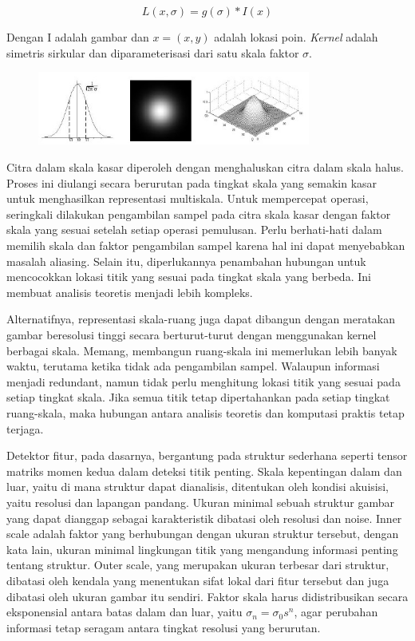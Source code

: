 \begin{equation}
L(x,\sigma) = g(\sigma) * I(x)
\label{eq:konvolusi}
\end{equation}

Dengan I adalah gambar dan \(x = (x,y)\) adalah lokasi poin.
\emph{Kernel} adalah simetris sirkular dan diparameterisasi dari satu skala faktor \(\sigma \).

\begin{figure}
  \centering{}
  \includegraphics[width=0.8\textwidth]{gambar/Uniform Gaussian kernel.jpg}
  \caption{}
\end{figure}

Citra dalam skala kasar diperoleh dengan menghaluskan citra dalam skala halus. 
Proses ini diulangi secara berurutan pada tingkat skala yang semakin kasar untuk menghasilkan representasi multiskala. 
Untuk mempercepat operasi, seringkali dilakukan pengambilan sampel pada citra skala kasar dengan faktor skala yang sesuai setelah setiap operasi pemulusan. 
Perlu berhati-hati dalam memilih skala dan faktor pengambilan sampel karena hal ini dapat menyebabkan masalah aliasing. 
Selain itu, diperlukannya penambahan hubungan untuk mencocokkan lokasi titik yang sesuai pada tingkat skala yang berbeda. 
Ini membuat analisis teoretis menjadi lebih kompleks.

Alternatifnya, representasi skala-ruang juga dapat dibangun dengan meratakan gambar beresolusi tinggi secara berturut-turut dengan menggunakan kernel berbagai skala. 
Memang, membangun ruang-skala ini memerlukan lebih banyak waktu, terutama ketika tidak ada pengambilan sampel. 
Walaupun informasi menjadi redundant, namun tidak perlu menghitung lokasi titik yang sesuai pada setiap tingkat skala. 
Jika semua titik tetap dipertahankan pada setiap tingkat ruang-skala, maka hubungan antara analisis teoretis dan komputasi praktis tetap terjaga.

Detektor fitur, pada dasarnya, bergantung pada struktur sederhana seperti tensor matriks momen kedua dalam deteksi titik penting. 
Skala kepentingan dalam dan luar, yaitu di mana struktur dapat dianalisis, ditentukan oleh kondisi akuisisi, yaitu resolusi dan lapangan pandang. 
Ukuran minimal sebuah struktur gambar yang dapat dianggap sebagai karakteristik dibatasi oleh resolusi dan noise. 
Inner scale adalah faktor yang berhubungan dengan ukuran struktur tersebut, dengan kata lain, ukuran minimal lingkungan titik yang mengandung informasi penting tentang struktur. Outer scale, yang merupakan ukuran terbesar dari struktur, dibatasi oleh kendala yang menentukan sifat lokal dari fitur tersebut dan juga dibatasi oleh ukuran gambar itu sendiri. 
Faktor skala harus didistribusikan secara eksponensial antara batas dalam dan luar, yaitu \(\sigma_{n} = \sigma_{0}s^{n}\), 
agar perubahan informasi tetap seragam antara tingkat resolusi yang berurutan.

